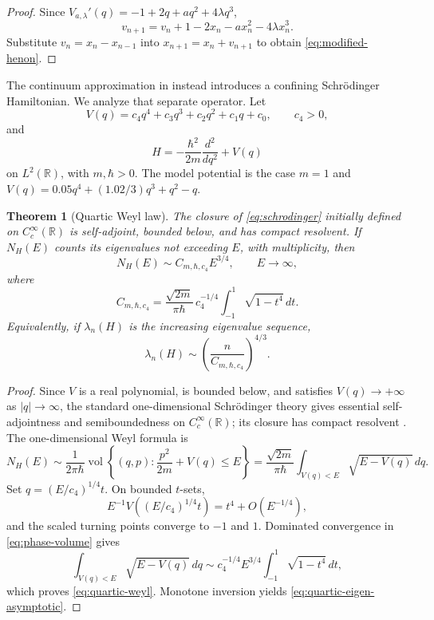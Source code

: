 \documentclass[11pt]{article}
\newtheorem{theorem}{Theorem}[section]
\theoremstyle{definition}
\theoremstyle{remark}
\newcommand{\R}{\mathbb R}
\begin{document}
\begin{proof}
Since $V_{a,\lambda}'(q)=-1+2q+a q^2+4\lambda q^3$,
\[
    v_{n+1}=v_n+1-2x_n-a x_n^2-4\lambda x_n^3.
\]
Substitute $v_n=x_n-x_{n-1}$ into $x_{n+1}=x_n+v_{n+1}$ to obtain \eqref{eq:modified-henon}.
\end{proof}

The continuum approximation in \citet{WangHenon2026} instead introduces a confining Schr\"odinger Hamiltonian.  We analyze that separate operator.  Let
\begin{equation}\label{eq:quartic-potential}
    V(q)=c_4q^4+c_3q^3+c_2q^2+c_1q+c_0,
    \qquad c_4>0,
\end{equation}
and
\begin{equation}\label{eq:schrodinger}
    H=-\frac{\hbar^2}{2m}\frac{d^2}{dq^2}+V(q)
\end{equation}
on $L^2(\R)$, with $m,\hbar>0$.  The model potential is the case
$m=1$ and $V(q)=0.05q^4+(1.02/3)q^3+q^2-q$.

\begin{theorem}[Quartic Weyl law]\label{thm:quartic-weyl}
The closure of \eqref{eq:schrodinger} initially defined on $C_c^\infty(\R)$ is self-adjoint, bounded below, and has compact resolvent.  If $N_H(E)$ counts its eigenvalues not exceeding $E$, with multiplicity, then
\begin{equation}\label{eq:quartic-weyl}
    N_H(E)\sim C_{m,\hbar,c_4}E^{3/4},
    \qquad E\to\infty,
\end{equation}
where
\begin{equation}\label{eq:weyl-constant}
    C_{m,\hbar,c_4}
    =\frac{\sqrt{2m}}{\pi\hbar}\,c_4^{-1/4}
      \int_{-1}^{1}\sqrt{1-t^4}\,dt.
\end{equation}
Equivalently, if $\lambda_n(H)$ is the increasing eigenvalue sequence,
\begin{equation}\label{eq:quartic-eigen-asymptotic}
    \lambda_n(H)\sim
    \left(\frac{n}{C_{m,\hbar,c_4}}\right)^{4/3}.
\end{equation}
\end{theorem}

\begin{proof}
Since $V$ is a real polynomial, is bounded below, and satisfies $V(q)\to+\infty$ as $|q|\to\infty$, the standard one-dimensional Schr\"odinger theory gives essential self-adjointness and semiboundedness on $C_c^\infty(\R)$; its closure has compact resolvent \citep{ReedSimonIV1978}.  The one-dimensional Weyl formula \citep{Rozenblum1974} is
\begin{equation}\label{eq:phase-volume}
    N_H(E)
    \sim\frac1{2\pi\hbar}
    \operatorname{vol}\left\{(q,p):\frac{p^2}{2m}+V(q)\le E\right\}
    =\frac{\sqrt{2m}}{\pi\hbar}
      \int_{V(q)<E}\sqrt{E-V(q)}\,dq.
\end{equation}
Set $q=(E/c_4)^{1/4}t$.  On bounded $t$-sets,
\[
    E^{-1}V((E/c_4)^{1/4}t)=t^4+O(E^{-1/4}),
\]
and the scaled turning points converge to $-1$ and $1$.  Dominated convergence in \eqref{eq:phase-volume} gives
\[
    \int_{V(q)<E}\sqrt{E-V(q)}\,dq
    \sim c_4^{-1/4}E^{3/4}
          \int_{-1}^{1}\sqrt{1-t^4}\,dt,
\]
which proves \eqref{eq:quartic-weyl}.  Monotone inversion yields \eqref{eq:quartic-eigen-asymptotic}.
\end{proof}
\end{document}
